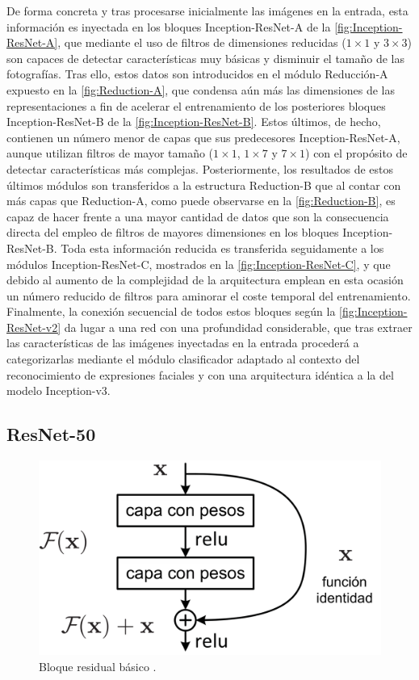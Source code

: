 De forma concreta y tras procesarse inicialmente las imágenes en la entrada, esta información es inyectada en los bloques Inception-ResNet-A de la \autoref{fig:Inception-ResNet-A}, que mediante el uso de filtros de dimensiones reducidas ($1\times 1$ y $3\times 3$) son capaces de detectar características muy básicas y disminuir el tamaño de las fotografías. Tras ello, estos datos son introducidos en el módulo Reducción-A expuesto en la \autoref{fig:Reduction-A}, que condensa aún más las dimensiones de las representaciones a fin de acelerar el entrenamiento de los posteriores bloques Inception-ResNet-B de la \autoref{fig:Inception-ResNet-B}. Estos últimos, de hecho, contienen un número menor de capas que sus predecesores Inception-ResNet-A, aunque utilizan filtros de mayor tamaño ($1\times 1$, $1\times 7$ y $7\times 1$) con el propósito de detectar características más complejas. Posteriormente, los resultados de estos últimos módulos son transferidos a la estructura Reduction-B que al contar con más capas que Reduction-A, como puede observarse en la \autoref{fig:Reduction-B}, es capaz de hacer frente a una mayor cantidad de datos que son la consecuencia directa del empleo de filtros de mayores dimensiones en los bloques Inception-ResNet-B. Toda esta información reducida es transferida seguidamente a los módulos Inception-ResNet-C, mostrados en la \autoref{fig:Inception-ResNet-C}, y que debido al aumento de la complejidad de la arquitectura emplean en esta ocasión un número reducido de filtros para aminorar el coste temporal del entrenamiento. Finalmente, la conexión secuencial de todos estos bloques según la \autoref{fig:Inception-ResNet-v2} da lugar a una red con una profundidad considerable, que tras extraer las características de las imágenes inyectadas en la entrada procederá a categorizarlas mediante el módulo clasificador adaptado al contexto del reconocimiento de expresiones faciales y con una arquitectura idéntica a la del modelo Inception-v3.

\subsection{ResNet-50}

\begin{figure}
    \centering
    \includegraphics[scale=0.18]{Images/ResnetBlock.png}
    \caption{Bloque residual básico \cite{ResNet}.}
    \label{fig:ResNetBlock}
\end{figure}

